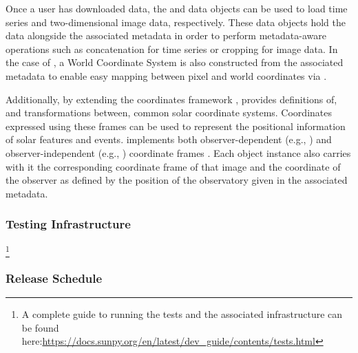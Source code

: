 Once a user has downloaded data, the  and  data objects can be used to load time series and two-dimensional image data, respectively.
These data objects hold the data alongside the associated metadata in order to perform metadata-aware operations such as concatenation for time series or cropping for image data.
In the case of , a World Coordinate System \citep[WCS, e.g.,][]{greisen_representations_2002} is also constructed from the associated metadata to enable easy mapping between pixel and world coordinates via \astropypkg.

Additionally, by extending the \astropypkg coordinates framework \citep[see Section 3.3 of][for more details]{the_astropy_collaboration_astropy_2018}, \sunpypkg provides definitions of, and transformations between, common solar coordinate systems.
Coordinates expressed using these frames can be used to represent the positional information of solar features and events. \sunpypkg implements both observer-dependent (e.g., \hpc) and observer-independent (e.g., \hgs) coordinate frames \citep{thompson_coordinate_2006}.
Each  object instance also carries with it the corresponding coordinate frame of that image and the coordinate of the observer as defined by the position of the observatory given in the associated metadata.

\subsubsection{Testing Infrastructure}
\label{sssection:testing}

\footnote{A complete guide to running the tests and the associated infrastructure can be found here:\url{https://docs.sunpy.org/en/latest/dev_guide/contents/tests.html}}

\subsubsection{Release Schedule}
\label{sssection:releases}

